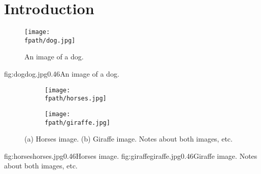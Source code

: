 \renewcommand{\fpath}{C01-Body/Figures}
\chapter{Introduction}
\label{ch:introduction}


\begin{figure}[ht!]
	\centering
	\texttt{[image: \\fpath/dog.jpg]}
	\caption{An image of a dog.}%
	\label{fig:dog}
\end{figure}

\singlefigure
{fig:dog}{dog.jpg}{0.46}{An image of a dog.}


\begin{figure}[ht!]
	\begin{subfigure}[H]{0.46\textwidth}
		\centering\texttt{[image: \\fpath/horses.jpg]}
		\caption{}%
		\label{fig:horses}
	\end{subfigure}
	\begin{subfigure}[H]{0.46\textwidth}
		\centering\texttt{[image: \\fpath/giraffe.jpg]}
		\caption{}%
		\label{fig:giraffe}
	\end{subfigure}
	\caption{(a) Horses image. (b) Giraffe image. Notes about both images, etc.}
	\label{fig:horses_and_giraffes}
\end{figure}

%
{fig:horses}{horses.jpg}{0.46}{Horses image.}%
{fig:giraffe}{giraffe.jpg}{0.46}{Giraffe image.}
{Notes about both images, etc.}


